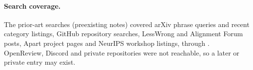 \paragraph{Search coverage.}
The prior-art searches (preexisting notes) covered arXiv phrase queries and recent category listings, GitHub repository searches, LessWrong and Alignment Forum posts, Apart project pages and NeurIPS workshop listings, through \wtthDesignPriorArtThrough.
OpenReview, Discord and private repositories were not reachable, so a later or private entry may exist.
